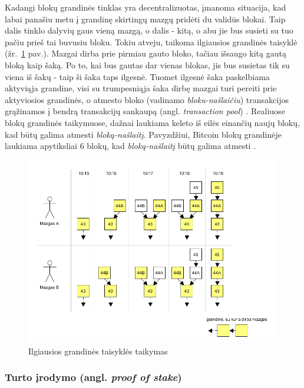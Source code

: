 Kadangi blokų grandinės tinklas yra decentralizuotas, įmanoma situacija, kad labai panašiu metu į grandinę skirtingų mazgų pridėti du validūs blokai.
Taip dalis tinklo dalyvių gaus vieną mazgą, o dalis - kitą, o abu jie bus susieti su tuo pačiu prieš tai buvusiu bloku.
Tokiu atveju, taikoma ilgiausios grandinės taisyklė (žr.~\ref{fig:blockchainLongestRule} pav.). Mazgai dirba prie pirmiau gauto bloko,
tačiau išsaugo kitą gautą bloką kaip šaką. Po to, kai bus gautas dar vienas blokas, jis bus susietas tik su viena iš šakų - taip ši šaka taps ilgesnė. Tuomet
ilgesnė šaka paskelbiama aktyviąja grandine, visi su trumpesniąja šaka dirbę mazgai turi pereiti prie aktyviosios grandinės, o atmesto bloko (vadinamo \textit{bloku-našlaičiu}) transakcijos
grąžinamos į bendrą transakcijų sankaupą (angl. \textit{transaction pool}) \cite{SatoshiNakamoto}.
Realiuose blokų grandinės taikymuose, dažnai laukiama keleto iš eilės einančių naujų blokų, kad būtų galima atmesti \textit{bloką-našlaitį}. Pavyzdžiui,
Bitcoin blokų grandinėje laukiama apytiksliai 6 blokų, kad \textit{bloką-našlaitį} būtų galima atmesti \cite{Zheng2017}.


\begin{figure}[H]
    \centering
    \includegraphics[scale=0.6]{img/blockchainLongestRule}
    \caption{Ilgiausios grandinės taisyklės taikymas}
    \label{fig:blockchainLongestRule}
\end{figure}

\subsubsection{Turto įrodymo (angl. \textit{proof of stake})}

